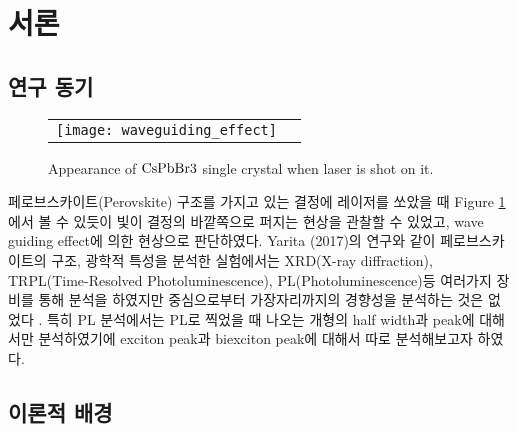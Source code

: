 
\section{서론}
\subsection{연구 동기}
\begin{figure}[H]
	\begin{center}
		\begin{tabular}{cc}
			\texttt{[image: waveguiding\_effect]}
		\end{tabular}
	\end{center}
	\caption{Appearance of $\rm CsPbBr3$ single crystal when laser is shot on it.}
	\label{fig:waveguide}  
\end{figure}
페로브스카이트(Perovskite) 구조를 가지고 있는 결정에 레이저를 쏘았을 때 Figure \ref{fig:waveguide} 에서 볼 수 있듯이 빛이 결정의 바깥쪽으로 퍼지는 현상을 관찰할 수 있었고, wave guiding effect에 의한 현상으로 판단하였다. Yarita (2017)의 연구와 같이 페로브스카이트의 구조, 광학적 특성을 분석한 실험에서는 XRD(X-ray diffraction), TRPL(Time-Resolved Photoluminescence), PL(Photoluminescence)등 여러가지 장비를 통해 분석을 하였지만 중심으로부터 가장자리까지의 경향성을 분석하는 것은 없었다 \cite{yarita2017dynamics}. 특히 PL 분석에서는 PL로 찍었을 때 나오는 개형의 half width과 peak에 대해서만 분석하였기에 exciton peak과 biexciton peak에 대해서 따로 분석해보고자 하였다. 
 

\subsection{이론적 배경}
